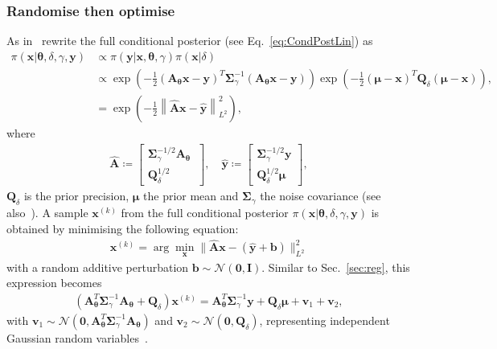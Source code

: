 \subsubsection{Randomise then optimise}
\label{subsec:RTO} 
As in~\cite{bardsley2012mcmc} rewrite the full conditional posterior (see Eq.~\ref{eq:CondPostLin}) as
\begin{align}
	\pi(\bm{x} | \bm{\theta},  \delta, \gamma, \bm{y}) & \propto \pi(\bm{y}|\bm{x},  \bm{\theta}, \gamma) \pi(\bm{x}| \delta)\\
	&\propto \exp \left(-\frac{1}{2} (\bm{A}_{\bm{\theta}}  \bm{x} - \bm{y})^T \bm{\Sigma}^{-1}_{\gamma} (\bm{A}_{\bm{\theta}}   \bm{x} - \bm{y})\right) \exp \left(-\frac{1}{2} (\bm{\mu} - \bm{x} )^T \bm{Q}_{\delta}(\bm{\mu} - \bm{x} ) \right),\\
	& = \exp \left( - \frac{1}{2}\left\lVert \hat{\bm{A}} \bm{x} - \hat{\bm{y}} \right\rVert_{L^2}^2 \right),
\end{align}
where
\begin{align}
	\label{eq:minimizer}
	\hat{\bm{A}} \coloneqq 
	\begin{bmatrix}
		\bm{\Sigma}_{\gamma}^{-1/2} \bm{A}_{\bm{\theta}} \ \\
		\bm{Q}_{\delta}^{1/2}
	\end{bmatrix}, \quad 
	\hat{\bm{y}} \coloneqq 
	\begin{bmatrix}
		\bm{\Sigma}_{\gamma}^{-1/2} \bm{y} \\
		\bm{Q}_{\delta}^{1/2} \bm{\mu}
	\end{bmatrix} , 
\end{align}
$\bm{Q}_{\delta}$ is the prior precision, $\bm{\mu}$ the prior mean and $\bm{\Sigma}_{\gamma}$ the noise covariance (see also~\cite{bardsley2014randomize,BardsleyTC2019RTO}).
A sample $\bm{x}^{(k)}$ from the full conditional posterior $ \pi(\bm{x}|   \bm{\theta},  \delta, \gamma,  \bm{y})$ is obtained by minimising the following equation:
\begin{align}
	\bm{x}^{(k)} = \arg \min_{\bm{x}} \lVert \hat{\bm{A}} \bm{x} - ( \hat{\bm{y}} + \bm{b} ) \rVert_{L^2}^2 
\end{align}
with a random additive perturbation $\bm{b} \sim \mathcal{N}(\bm{0}, \bm{I})$.
Similar to Sec.~\ref{sec:reg}, this expression becomes
\begin{align}
	\label{eq:RTO}
	\left( \bm{A}_{\bm{\theta}}^T \bm{\Sigma}^{-1}_{\gamma} \bm{A}_{\bm{\theta}} + \bm{Q}_{\delta} \right) \bm{x}^{(k)} = \bm{A}_{\bm{\theta}}^T \bm{\Sigma}^{-1}_{\gamma} \bm{y} + \bm{Q}_{\delta} \bm{\mu} + \bm{v}_1 + \bm{v}_2,
\end{align}
with $\bm{v}_1 \sim \mathcal{N}(\bm{0}, \bm{A}_{\bm{\theta}}^T \bm{\Sigma}^{-1}_{\gamma} \bm{A}_{\bm{\theta}})$ and $\bm{v}_2 \sim \mathcal{N}(\bm{0}, \bm{Q}_{\delta})$, representing independent Gaussian random variables~\cite{bardsley2012mcmc, fox2016fast}.



